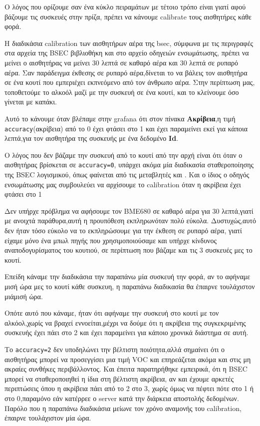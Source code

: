 Ο λόγος που ορίζουμε σαν ένα κύκλο πειραμάτων με τέτοιο τρόπο είναι γιατί αφού
βάζουμε τις συσκευές στην πρίζα,
πρέπει να κάνουμε calibrate τους αισθητήρες κάθε φορά.

Η διαδικάσια calibration των αισθητήρων αέρα της bsec, σύμφωνα με τις περιγραφές στα
αρχεία της BSEC βιβλιοθήκη και στο αρχείο οδηγειών ενσωμάτωσης,
πρέπει να μείνει ο αισθητήρας να μείνει 30 λεπτά σε καθαρό αέρα και 30 λεπτά σε ρυπαρό
αέρα.
Σαν παράδειγμα έκθεσης σε ρυπαρό αέρα,δίνεται το να βάλεις τον αισθητήρα σε ένα κουτί
που εμπεριέχει
εκπνεόμενο από τον άνθρωπο αέρα.
Στην περίπτωση μας, τοποθετούμε το αλκοόλ μαζί με την συσκευή σε ένα κουτί,
και το κλείνουμε όσο γίνεται με καπάκι.

Αυτό το κάνουμε όταν βλέπαμε στην grafana ότι στον πίνακα \textbf{Ακρίβεια},η τιμή
\texttt{accuracy}(ακρίβεια) από το 0 έχει φτάσει στο 1 και έχει παραμείνει εκεί για κάποια
λεπτά,για τον αισθητήρα της συσκευής με ένα δεδομένο \textbf{Id}.

Ο λόγος που δεν βάζαμε την συσκευή από το κουτί από την αρχή είναι ότι όταν ο
αισθητήρας βρίσκεται σε \texttt{accuracy=0},
υπάρχει ακόμα μία διαδικασία σταθεροποίησης της BSEC λογισμικού, όπως φαίνεται από
τις μεταβλητές \texttt{} και
\texttt{}.
Και ο ίδιος ο οδηγός ενσωμάτωσης μας συμβουλεύει να αρχίσουμε το calibration όταν η
ακρίβεια έχει φτάσει στο 1

Δεν υπήρχε πρόβλημα να αφήσουμε τον BME680 σε καθαρό αέρα για 30 λεπτά,γιατί με
ανοιχτά παράθυρα,αυτή η προυπόθεση εκπληρωνόταν πολύ εύκολα.
Δυστυχώς,αυτό δεν ήταν τόσο εύκολο να το εκπληρώσουμε για την έκθεση σε ρυπαρό αέρα,
γιατί είχαμε μόνο ένα μπωλ πηγής που χρησιμοποιούσαμε και υπήρχε κίνδυνος
αναποδογυρίσματος του κουτιού,
σε περίπτωση που βάζαμε και τις 3 συσκευές μες το κουτί.

Επείδη κάναμε την διαδικάσια την παραπάνω μία συσκευή την φορά, αν το αφήναμε μισή
ώρα μες το κουτί κάθε συσκευη,
η παραπάνω διαδικασία θα έπαιρνε τουλάχιστον μιάμισή ώρα.

Οπότε αυτό που κάναμε, ήταν ότι αφήναμε την συσκευή στο κουτί με τον αλκόολ,χωρίς να
βραχεί εννοείται,μέχρι να δούμε ότι η ακρίβεια της συγκεκριμένης συσκευής
έχει πάει στο 2 και έχει παραμείνει για κάποιο χρονικά διάστημα σε αυτή.

Το \texttt{accuracy=2} δεν υποδηλώνει την βέλτιστη ποιότητα,αλλά σημαίνει ότι ο
αισθητήρας μπορεί να προσεγγίσει μια τιμή VOC και επηρεάζεται ακόμα και στις μη
ακραίες συνθήκες περιβάλλοντος.
Και έπειτα παρατηρήθηκε εμπειρικά, ότι η BSEC μπορεί να σταθεροποιηθεί η ίδια στη
βέλτιστη ακρίβεια, αν και έχουμε αρκετές περιπτώσεις όπου η ακρίβεια πάει από το 2 στο
3,
χωρίς όμως να πέφτει πότε στο 1 ή στο 0,παραμόνο εάν κατέρρεε ο server κατά την διάρκεια
αποστολής δεδομένων.
Παρόλο που η παραπάνω διαδικάσια μείωνε τον χρόνο αναμονής του calibration, έπαιρνε
τουλάχιστον μία ώρα.

